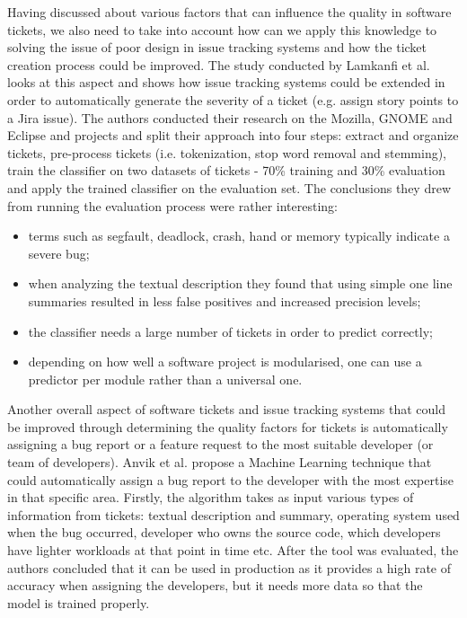 \documentclass{mpaper}
\begin{document}
Having discussed about various factors that can influence the quality in software tickets, 
we also need to take into account how can we apply this knowledge to solving the issue of 
poor design in issue tracking systems and how the ticket creation process could be improved. 
The study conducted by Lamkanfi et al. \cite{lamkanfi2010predicting} looks at this aspect and
shows how issue tracking systems could be extended in order to automatically generate the severity 
of a ticket (e.g. assign story points to a Jira issue). The authors conducted their research on the Mozilla,
GNOME and Eclipse and projects and split their approach into four steps: extract and organize tickets, 
pre-process tickets (i.e. tokenization, stop word removal and stemming), train the classifier on two datasets 
of tickets - 70\% training and 30\% evaluation and apply the trained classifier on the evaluation set.
The conclusions they drew from running the evaluation process were rather 
interesting:
  \begin{itemize}
    \item terms such as segfault, deadlock, crash, hand or memory typically indicate
      a severe bug;
    \item when analyzing the textual description they found that using simple
      one line summaries resulted in less false positives and increased precision
      levels;
    \item the classifier needs a large number of tickets in order to predict correctly;
    \item depending on how well a software project is modularised, one can 
      use a predictor per module rather than a universal one.
  \end{itemize}

Another overall aspect of software tickets and issue tracking systems that could be improved through 
determining the quality factors for tickets is automatically assigning a bug report or a feature request 
to the most suitable developer (or team of developers). Anvik et al. \cite{anvik2011reducing}
propose a Machine Learning technique that could automatically assign a bug report to the developer 
with the most expertise in that specific area. Firstly, the algorithm takes as input various types of information from 
tickets: textual description and summary, operating system used when the bug occurred, developer 
who owns the source code, which developers have lighter workloads at that point in time etc. After the 
tool was evaluated, the authors concluded that it can be used in production as it provides a high 
rate of accuracy when assigning the developers, but it needs more data so that the model is trained 
properly.
\end{document}
